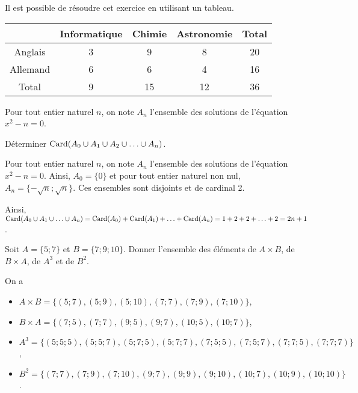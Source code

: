 \documentclass[11pt,fleqn, openany]{book} %
\begin{document}
\begin{solution}Il est possible de résoudre cet exercice en utilisant un tableau.

\begin{center}
\begin{tabular}{|c|c|c|c|c|}
\hline
 & Informatique & Chimie & Astronomie & Total \\
 \hline
 Anglais &3&9&8&20 \\
 \hline
 Allemand &6&6&4&16\\
 \hline
 Total &9&15&12&36 \\
 \hline \end{tabular}
\end{center}\end{solution}




\begin{exercise}[topic=comb01]Pour tout entier naturel $n$, on note $A_n$ l'ensemble des solutions de l'équation $x^2-n=0$. 

Déterminer $\mathrm{Card}(A_0 \cup A_1 \cup A_2 \cup \ldots \cup A_n)$.	
\end{exercise}

\begin{solution}Pour tout entier naturel $n$, on note $A_n$ l'ensemble des solutions de l'équation $x^2-n=0$. Ainsi, $A_0=\{0\}$ et pour tout entier naturel non nul, $A_n=\{-\sqrt{n} ; \sqrt{n}\}$. Ces ensembles sont disjoints et de cardinal 2.

Ainsi, $\mathrm{Card}(A_0 \cup A_1  \cup \ldots \cup A_n)=\mathrm{Card}(A_0)+\mathrm{Card}(A_1)+\ldots + \mathrm{Card}(A_n)=1+2+2+\ldots + 2=2n+1$.\end{solution}





\begin{exercise}[topic=comb01]Soit $A=\{5;7\}$ et $B=\{7;9;10\}$. Donner l'ensemble des éléments de $A\times B$, de $B \times A$, de $A^3$ et de $B^2$.\end{exercise}

\begin{solution} On a
\begin{itemize}
\item $A\times B=\{(5;7), (5;9), (5;10), (7;7), (7;9), (7;10)\}$, 
\item $B \times A = \{(7;5),(7;7), (9;5), (9;7), (10;5), (10;7)\}$, 
\item $A^3 = \{(5;5;5),(5;5;7),(5;7;5), (5;7;7), (7;5;5),(7;5;7),(7;7;5),(7;7;7)\}$,
\item $B^2=\{(7;7),(7;9),(7;10),(9;7),(9;9),(9;10),(10;7),(10;9),(10;10)\}$.
\end{itemize}\end{solution}
\end{document}
